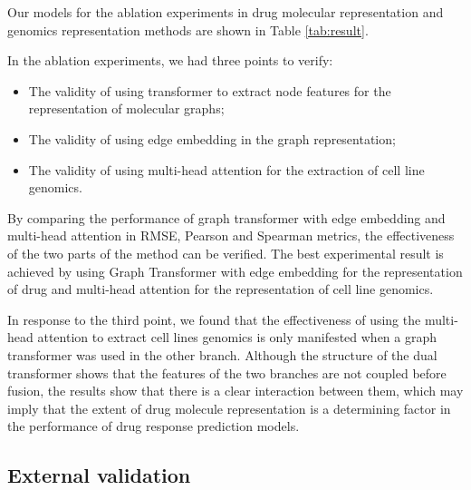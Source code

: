 \documentclass{article}
\begin{document}
Our models for the ablation experiments in drug molecular representation  and genomics representation methods are shown in Table \ref{tab:result}. 

In the ablation experiments, we had three points to verify: 


\begin{itemize}
\item The validity of using transformer to extract node features for the representation of molecular graphs;
\item The validity of using edge embedding in the graph representation;
\item The validity of using multi-head attention for the extraction of cell line genomics.
\end{itemize} 


By comparing the performance of graph transformer with edge embedding and multi-head attention in RMSE, Pearson and Spearman metrics, the effectiveness of the two parts of the method can be verified. The best experimental result is achieved by using Graph Transformer with edge embedding for the representation of drug and multi-head attention for the representation of cell line genomics.



In response to the third point, we found that the effectiveness of using the multi-head attention to extract cell lines genomics is only manifested when a graph transformer was used in the other branch. Although the structure of the dual transformer shows that the features of the two branches are not coupled before fusion, the results show that there is a clear interaction between them, which may imply that the extent of drug molecule representation is a determining factor in the performance of drug response prediction models.







\subsection{External validation}
\end{document}
